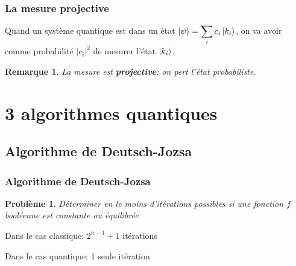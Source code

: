 \documentclass{beamer}
\newtheorem{pb}{Problème}
\newtheorem{rem}{Remarque}
\begin{document}
\begin{frame}
\frametitle{La mesure projective}
\begin{definition}
  Quand un système quantique est dans un état $\ket{\psi} = \displaystyle\sum_{i} c_i \ket{k_i}$, on va avoir comme probabilité $|c_i|^2$ de mesurer l'état $\ket{k_i}$.
\end{definition}

\begin{rem}
  La mesure est \textbf{projective}: on pert l'état probabiliste.
\end{rem}


\end{frame}

\section{3 algorithmes quantiques}


\subsection{Algorithme de Deutsch-Jozsa}

\begin{frame}
\frametitle{Algorithme de Deutsch-Jozsa \cite{Deutsch92}}

\begin{pb}
  Déterminer en le moins d'itérations possibles si une fonction $f$ booléenne est constante ou équilibrée
\end{pb}

\medbreak
Dans le cas classique: $2^{n-1} + 1$ itérations

\medbreak
Dans le cas quantique: 1 seule itération

\end{frame}
\end{document}
